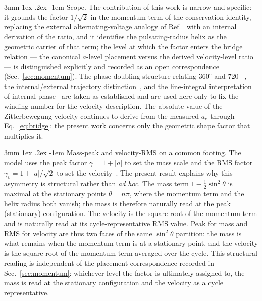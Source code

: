 \documentclass[%
 reprint, amsmath,amssymb, aps, prb, ]{revtex4-2}
\makeatletter
\numberwithin{equation}{section}
\renewcommand\paragraph{%
  \@startsection{paragraph}{4}{\z@}%
    {3mm \@plus 1ex \@minus .2ex}%
    {-1em}%
    {\normalfont\normalsize\itshape}}
\makeatother
\begin{document}
\paragraph{Scope.}
The contribution of this work is narrow and specific: it grounds the factor $1/\sqrt{2}$ in the momentum term of the conservation identity, replacing the external alternating-voltage analogy of Ref.~\cite{hanamura10} with an internal derivation of the ratio, and it identifies the pulsating-radius helix as the geometric carrier of that term; the level at which the factor enters the bridge relation --- the canonical $a$-level placement versus the derived velocity-level ratio --- is distinguished explicitly and recorded as an open correspondence (Sec.~\ref{sec:momentum}). The phase-doubling structure relating $360^\circ$ and $720^\circ$~\cite{hanamura19}, the internal/external trajectory distinction~\cite{hanamura24,hanamura29}, and the line-integral interpretation of internal phase~\cite{hanamura29} are taken as established and are used here only to fix the winding number for the velocity description. The absolute value of the Zitterbewegung velocity continues to derive from the measured $a_e$ through Eq.~\eqref{eq:bridge}; the present work concerns only the geometric shape factor that multiplies it.

\paragraph{Mass-peak and velocity-RMS on a common footing.}
The model uses the peak factor $\gamma=1+\lvert a\rvert$ to set the mass scale and the RMS factor $\gamma_v=1+\lvert a\rvert/\sqrt{2}$ to set the velocity~\cite{hanamura61}. The present result explains why this asymmetry is structural rather than \emph{ad hoc}. The mass term $1-\tfrac{1}{2}\sin^2\theta$ is maximal at the stationary points $\theta=n\pi$, where the momentum term and the helix radius both vanish; the mass is therefore naturally read at the peak (stationary) configuration. The velocity is the square root of the momentum term and is naturally read at its cycle-representative RMS value. Peak for mass and RMS for velocity are thus two faces of the same $\sin^2\theta$ partition: the mass is what remains when the momentum term is at a stationary point, and the velocity is the square root of the momentum term averaged over the cycle. This structural reading is independent of the placement correspondence recorded in Sec.~\ref{sec:momentum}: whichever level the factor is ultimately assigned to, the mass is read at the stationary configuration and the velocity as a cycle representative.
\end{document}
